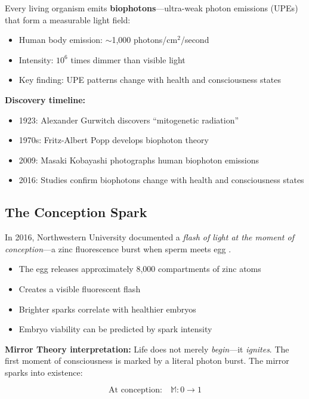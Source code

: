\documentclass[12pt,a4paper]{article}
\begin{document}
Every living organism emits \textbf{biophotons}---ultra-weak photon emissions (UPEs) that form a measurable light field:

\begin{itemize}
    \item Human body emission: $\sim$1,000 photons/cm$^2$/second
    \item Intensity: $10^6$ times dimmer than visible light
    \item Key finding: UPE patterns change with health and consciousness states
\end{itemize}

\textbf{Discovery timeline:}
\begin{itemize}
    \item 1923: Alexander Gurwitch discovers ``mitogenetic radiation'' \cite{gurwitch1923}
    \item 1970s: Fritz-Albert Popp develops biophoton theory \cite{popp1976}
    \item 2009: Masaki Kobayashi photographs human biophoton emissions \cite{kobayashi2009}
    \item 2016: Studies confirm biophotons change with health and consciousness states
\end{itemize}

\subsection{The Conception Spark}

In 2016, Northwestern University documented a \textit{flash of light at the moment of conception}---a zinc fluorescence burst when sperm meets egg \cite{northwestern2016}.

\begin{itemize}
    \item The egg releases approximately 8,000 compartments of zinc atoms
    \item Creates a visible fluorescent flash
    \item Brighter sparks correlate with healthier embryos
    \item Embryo viability can be predicted by spark intensity
\end{itemize}

\textbf{Mirror Theory interpretation:} Life does not merely \textit{begin}---it \textit{ignites}. The first moment of consciousness is marked by a literal photon burst. The mirror sparks into existence:

\begin{equation}
\text{At conception:} \quad \mathbb{M}: 0 \rightarrow 1
\end{equation}
\end{document}
